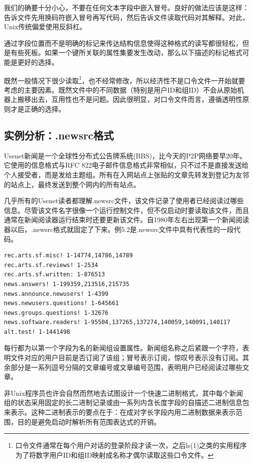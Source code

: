 \documentclass[12pt,oneside]{book}
\begin{document}
我们的确要十分小心，不要在任何文本字段中嵌入冒号。良好的做法应该是这样：告诉文件先用换码符嵌入冒号再写代码，然后告诉文件读取代码对其解释。对此，Unix传统偏爱使用反斜杠。

通过字段位置而不是明确的标记来传达结构信息使得这种格式的读写都很轻松，但是有些死板。如果一个键所关联的属性集要发生改动，那么以下描述的标记格式可能是更好的选择。

既然一般情况下很少读取\footnote{口令文件通常在每个用户对话的登录阶段才读一次，之后ls(1)之类的实用程序为了将数字用户ID和组ID映射成名称才偶尔读取这些口令文件。}，也不经常修改，所以经济性不是口令文件一开始就要考虑的主要因素。既然文件中的不同数据（特别是用户ID和组ID）不会从原始机器上搬移出去，互用性也不是问题。因此很明显，对口令文件而言，遵循透明性原则才是正确的选择。


\subsection{实例分析：.newsrc格式}
Usenet新闻是一个全球性分布式公告牌系统(BBS)，比今天的P2P网络要早20年。它使用的信息格式与RFC 822电子邮件信息格式非常相似，只不过不是直接发送给个人接受者，而是发给主题组。所有在入网站点上张贴的文章先转发到登记为友邻的站点上，最终发送到整个网内的所有站点。

几乎所有的Usenet读者都理解.newsrc文件，该文件记录了使用者已经阅读过哪些信息。尽管该文件名字很像一个运行控制文件，但不仅启动时要读取该文件，而且通常在新闻阅读器运行结束时还要更新该文件。自1980年左右出现第一个新闻阅读器以后，.newsrc格式就固定了下来。例5.2是.newsrc文件中具有代表性的一段代码。
\begin{Verbatim}[label=.newsrc实例]
rec.arts.sf.misc! 1-14774,14786,14789
rec.arts.sf.reviews! 1-2534
rec.arts.sf.written: 1-876513
news.answers! 1-199359,213516,215735
news.announce.newusers! 1-4399
news.newusers.questions! 1-645661
news.groups.questions! 1-32676
news.software.readers! 1-95504,137265,137274,140059,140091,140117
alt.test! 1-1441498
\end{Verbatim}

每行都为以第一个字段为名的新闻组设置属性。新闻组名称之后紧跟一个字符，表明文件对应的用户目前是否订阅了该组；冒号表示订阅，惊叹号表示没有订阅。其余部分是一系列逗号分隔的文章编号或文章编号范围，表明用户已经阅读过哪些文章。

非Unix程序员也许会自然而然地去试图设计一个快速二进制格式，其中每个新闻组的状态采用固定的长二进制记录或由一系列内含长度字段的自描述二进制信息包来表示。这种二进制表示的要点在于：在成对字长字段内用二进制数据来表示范围，目的是避免启动时解析所有范围表达式的开销。
\end{document}
